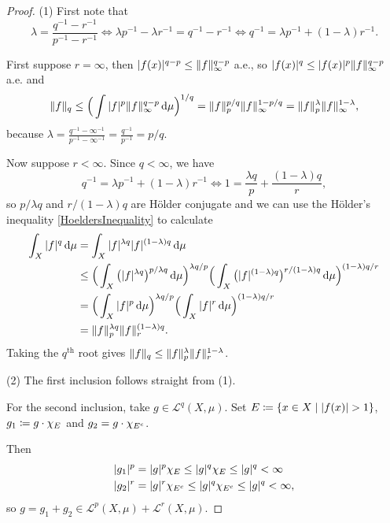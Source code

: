 \begin{proof}
(1) First note that
\[ \lambda = \frac{q^{-1} - r^{-1}}{p^{-1} - r^{-1}} \iff \lambda p^{-1} - \lambda r^{-1} = q^{-1} - r^{-1} \iff q^{-1} = \lambda p^{-1} + (1-\lambda)r^{-1}. \]
 
First suppose $r = \infty$, then $|f(x)|^{q-p} \leq \lVert f\rVert_\infty^{q-p}$ a.e., so $|f(x)|^q \leq |f(x)|^p\lVert f\rVert_\infty^{q-p}$ a.e. and
\[ \lVert f\rVert_q \leq \Big(\int |f|^p\lVert f\rVert_\infty^{q-p} \operatorname{d \!}\mu\Big)^{1/q} = \lVert f\rVert_p^{p/q}\lVert f\rVert_\infty^{1-p/q} = \lVert f\rVert_p^{\lambda}\lVert f\rVert_\infty^{1-\lambda}, \]
because $\lambda = \frac{q^{-1} - \infty^{-1}}{p^{-1} - \infty^{-1}} = \frac{q^{-1}}{p^{-1}} = p/q$.

Now suppose $r < \infty$. Since $q<\infty$, we have
\[ q^{-1} = \lambda p^{-1} + (1-\lambda)r^{-1} \iff 1 = \frac{\lambda q}{p} + \frac{(1-\lambda) q}{r}, \]
so $p/\lambda q$ and $r/(1-\lambda)q$ are Hölder conjugate and we can use the Hölder's inequality \ref{HoeldersInequality} to calculate
\begin{align*}
\int_X |f|^q \operatorname{d \!}{\mu} &= \int_X |f|^{\lambda q}|f|^{(1-\lambda)q} \operatorname{d \!}{\mu} \\
&\leq \Big(\int_X \big(|f|^{\lambda q}\big)^{p/\lambda q}\operatorname{d \!}{\mu}\Big)^{\lambda q /p} \Big(\int_X \big(|f|^{(1 -\lambda) q}\big)^{r/(1-\lambda)q}\operatorname{d \!}{\mu}\Big)^{(1 - \lambda) q /r} \\
&= \Big(\int_X |f|^{p}\operatorname{d \!}{\mu}\Big)^{\lambda q /p} \Big(\int_X |f|^{r}\operatorname{d \!}{\mu}\Big)^{(1 - \lambda) q /r} \\
&= \lVert f\rVert_p^{\lambda q}\lVert f\rVert_r^{(1-\lambda) q}.
\end{align*}
Taking the $q^\text{th}$ root gives $\lVert f\rVert_q \leq \lVert f\rVert_p^{\lambda}\lVert f\rVert_r^{1-\lambda}$.

(2) The first inclusion follows straight from (1).

For the second inclusion, take $g\in \mathcal{L}^q(X,\mu)$. Set $E \defeq \setbuilder{x\in X}{|f(x)| > 1}$, $g_1 \coloneqq g\cdot \chi_{E}$ and $g_2 = g\cdot \chi_{E^c}$.

Then
\begin{align*}
|g_1|^p &= |g|^p\chi_{E} \leq |g|^q\chi_{E} \leq |g|^q < \infty \\
|g_2|^r &= |g|^r\chi_{E^c} \leq |g|^q\chi_{E^c} \leq |g|^q < \infty,
\end{align*}
so $g = g_1 + g_2 \in \mathcal{L}^p(X,\mu) + \mathcal{L}^r(X,\mu)$.
\end{proof}


